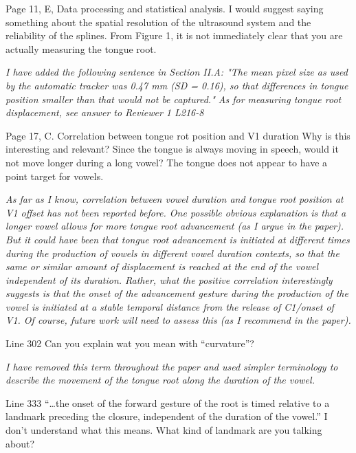 \documentclass[]{article}
\begin{document}
Page 11, E, Data processing and statistical analysis. I would suggest
saying something about the spatial resolution of the ultrasound system
and the reliability of the splines. From Figure 1, it is not immediately
clear that you are actually measuring the tongue root.

\begin{adjustwidth}{1cm}{} \textit{
I have added the following sentence in Section II.A: "The mean pixel size as used by the automatic tracker was 0.47 mm (SD = 0.16), so that differences in tongue position smaller than that would not be captured."
As for measuring tongue root displacement, see answer to Reviewer 1 L216-8
} \end{adjustwidth}

Page 17, C. Correlation between tongue rot position and V1 duration Why
is this interesting and relevant? Since the tongue is always moving in
speech, would it not move longer during a long vowel? The tongue does
not appear to have a point target for vowels.

\begin{adjustwidth}{1cm}{} \textit{
As far as I know, correlation between vowel duration and tongue root position at V1 offset has not been reported before. One possible obvious explanation is that a longer vowel allows for more tongue root advancement (as I argue in the paper). But it could have been that tongue root advancement is initiated at different times during the production of vowels in different vowel duration contexts, so that the same or similar amount of displacement is reached at the end of the vowel independent of its duration. Rather, what the positive correlation interestingly suggests is that the onset of the advancement gesture during the production of the vowel is initiated at a stable temporal distance from the release of C1/onset of V1. Of course, future work will need to assess this (as I recommend in the paper).
} \end{adjustwidth}

Line 302 Can you explain wat you mean with ``curvature''?

\begin{adjustwidth}{1cm}{} \textit{
I have removed this term throughout the paper and used simpler terminology to describe the movement of the tongue root along the duration of the vowel.
} \end{adjustwidth}

Line 333 ``\ldots{}the onset of the forward gesture of the root is timed
relative to a landmark preceding the closure, independent of the
duration of the vowel.'' I don't understand what this means. What kind
of landmark are you talking about?
\end{document}
